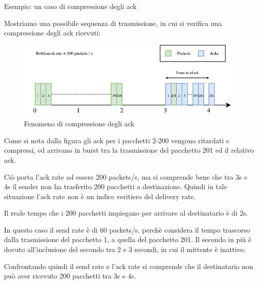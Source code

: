 \begin{esempio}{Esempio: un caso di compressione degli ack}

Mostriamo una possibile sequenza di trasmissione, in cui si verifica una compressione degli ack ricevuti:

\begin{figure}[H]

\center
\caption{Fenomeno di compressione degli ack}
\includegraphics[scale=0.9]{chapters/3_bbr/img/ack_rate_overstimate.pdf}

\end{figure}

Come si nota dalla figura gli ack per i pacchetti 2-200 vengono ritardati e compressi, ed arrivano in burst tra la trasmissione del pacchetto 201 ed il relativo ack. \bigskip

Ciò porta l'ack rate ad essere 200 packets/s, ma si comprende bene che tra 3s e 4s il sender non ha trasferito 200 pacchetti a destinazione. Quindi in tale situazione l'ack rate non è un indice veritiero del delivery rate. \bigskip

Il reale tempo che i 200 pacchetti impiegano per arrivare al destinatario è di 2s. \bigskip

In questo caso il send rate è di 60 packets/s, perchè considera il tempo trascorso dalla trasmissione del pacchetto 1, a quella del pacchetto 201. Il secondo in più è dovuto all'inclusione del secondo tra 2 e 3 secondi, in cui il mittente è inattivo. \bigskip

Confrontando quindi il send rate e l'ack rate si comprende che il destinatario non può aver ricevuto 200 pacchetti tra 3s e 4s.

\end{esempio}


